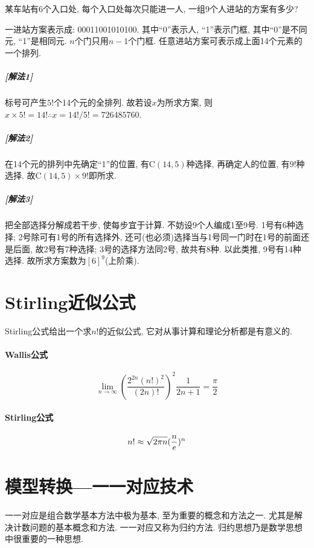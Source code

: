         \begin{example}
            某车站有6个入口处, 每个入口处每次只能进一人, 一组9个人进站的方案有多少? 

            \begin{sol}
                一进站方案表示成: 00011001010100. 其中``0''表示人, ``1''表示门框, 其中``0''是不同元, ``1''是相同元. $n$个门只用$n-1$个门框. 任意进站方案可表示成上面14个元素的一个排列. 
                \subparagraph{\rm\textbf{[解法1]}} 标号可产生$5!$个14个元的全排列. 故若设$x$为所求方案, 则$x\times5!=14!\therefore x=14!/5!=726485760$.
                \subparagraph{\rm\textbf{[解法2]}} 在14个元的排列中先确定``1''的位置, 有C$(14,5)$种选择, 再确定人的位置, 有$9!$种选择. 故C$(14,5)\times9!$即所求. 
                \subparagraph{\rm\textbf{[解法3]}} 把全部选择分解成若干步, 使每步宜于计算. 不妨设9个人编成1至9号. 1号有6种选择; 2号除可有1号的所有选择外, 还可(也必须)选择当与1号同一门时在1号的前面还是后面, 故2号有7种选择; 3号的选择方法同2号, 故共有8种. 以此类推, 9号有14种选择. 故所求方案数为$[6]^9$(上阶乘). 
            \end{sol}
        \end{example}

\section{Stirling近似公式}

    Stirling公式给出一个求$n!$的近似公式, 它对从事计算和理论分析都是有意义的. 

    \paragraph{Wallis公式}

        \[\lim_{n\to\infty}(\frac{2^{2n}(n!)^2}{(2n)!})^2\frac{1}{2n+1}=\frac{\pi}{2}\]

    \paragraph{Stirling公式}

        \[n!\approx\sqrt{2\pi n}({n\over e})^n\]

\section{模型转换---一一对应技术}

    \textsf{一一对应}是组合数学基本方法中极为基本, 至为重要的概念和方法之一. 尤其是解决计数问题的基本概念和方法. 一一对应又称为\textsf{归约方法}. 归约思想乃是数学思想中很重要的一种思想. 

